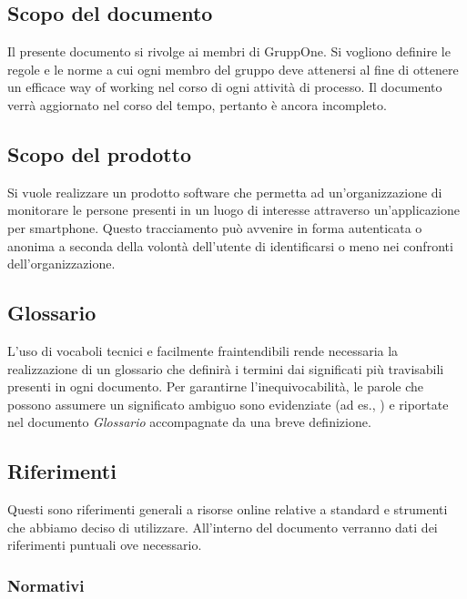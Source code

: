 \documentclass[../norme-di-progetto.tex]{subfiles}
\begin{document}
\subsection{Scopo del documento}%
\label{sub:scopo_del_documento}

Il presente documento si rivolge ai membri di GruppOne.
Si vogliono definire le regole e le norme a cui ogni membro del gruppo deve attenersi al fine di ottenere un efficace way of working nel corso di ogni attività di processo.
Il documento verrà aggiornato nel corso del tempo, pertanto è ancora incompleto.

\subsection{Scopo del prodotto}%
\label{sub:scopo_del_prodotto}

Si vuole realizzare un prodotto software che permetta ad un'organizzazione di monitorare le persone presenti in un luogo di interesse attraverso un'applicazione per smartphone.
Questo tracciamento può avvenire in forma autenticata o anonima a seconda della volontà dell'utente di identificarsi o meno nei confronti dell'organizzazione.

\subsection{Glossario}%
\label{sub:glossario}

L'uso di vocaboli tecnici e facilmente fraintendibili rende necessaria la realizzazione di un glossario che definirà i termini dai significati più travisabili presenti in ogni documento.
Per garantirne l'inequivocabilità, le parole che possono assumere un significato ambiguo sono evidenziate (ad es., ) e riportate nel documento \textit{Glossario} accompagnate da una breve definizione.

\subsection{Riferimenti}%
\label{sub:riferimenti}

Questi sono riferimenti generali a risorse online relative a standard e strumenti che abbiamo deciso di utilizzare.
All'interno del documento verranno dati dei riferimenti puntuali ove necessario.

\subsubsection{Normativi}%
\label{subs:riferimenti/normativi}
\end{document}
